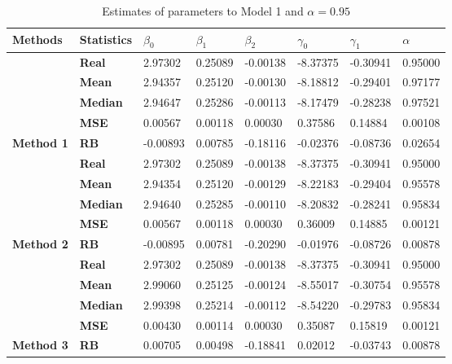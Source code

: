 \begin{table}[h]

\caption{\label{tab:Est_model_1_Alpha0.95}Estimates of parameters to Model 1 and $\alpha=0.95$}
\centering
\begin{tabular}[t]{>{}l>{}lllllll}
\toprule
Methods & Statistics & $\beta_0$ & $\beta_1$ & $\beta_2$ & $\gamma_0$ & $\gamma_1$ & $\alpha$\\
\midrule
 & \textbf{Real} & 2.97302 & 0.25089 & -0.00138 & -8.37375 & -0.30941 & 0.95000\\
\cmidrule{2-8}
 & \textbf{Mean} & 2.94357 & 0.25120 & -0.00130 & -8.18812 & -0.29401 & 0.97177\\
\cmidrule{2-8}
 & \textbf{Median} & 2.94647 & 0.25286 & -0.00113 & -8.17479 & -0.28238 & 0.97521\\
\cmidrule{2-8}
 & \textbf{MSE} & 0.00567 & 0.00118 & 0.00030 & 0.37586 & 0.14884 & 0.00108\\
\cmidrule{2-8}
\multirow{-5}{*}{\raggedright\arraybackslash \textbf{Method 1}} & \textbf{RB} & -0.00893 & 0.00785 & -0.18116 & -0.02376 & -0.08736 & 0.02654\\
\cmidrule{1-8}
 & \textbf{Real} & 2.97302 & 0.25089 & -0.00138 & -8.37375 & -0.30941 & 0.95000\\
\cmidrule{2-8}
 & \textbf{Mean} & 2.94354 & 0.25120 & -0.00129 & -8.22183 & -0.29404 & 0.95578\\
\cmidrule{2-8}
 & \textbf{Median} & 2.94640 & 0.25285 & -0.00110 & -8.20832 & -0.28241 & 0.95834\\
\cmidrule{2-8}
 & \textbf{MSE} & 0.00567 & 0.00118 & 0.00030 & 0.36009 & 0.14885 & 0.00121\\
\cmidrule{2-8}
\multirow{-5}{*}{\raggedright\arraybackslash \textbf{Method 2}} & \textbf{RB} & -0.00895 & 0.00781 & -0.20290 & -0.01976 & -0.08726 & 0.00878\\
\cmidrule{1-8}
 & \textbf{Real} & 2.97302 & 0.25089 & -0.00138 & -8.37375 & -0.30941 & 0.95000\\
\cmidrule{2-8}
 & \textbf{Mean} & 2.99060 & 0.25125 & -0.00124 & -8.55017 & -0.30754 & 0.95578\\
\cmidrule{2-8}
 & \textbf{Median} & 2.99398 & 0.25214 & -0.00112 & -8.54220 & -0.29783 & 0.95834\\
\cmidrule{2-8}
 & \textbf{MSE} & 0.00430 & 0.00114 & 0.00030 & 0.35087 & 0.15819 & 0.00121\\
\cmidrule{2-8}
\multirow{-5}{*}{\raggedright\arraybackslash \textbf{Method 3}} & \textbf{RB} & 0.00705 & 0.00498 & -0.18841 & 0.02012 & -0.03743 & 0.00878\\
\bottomrule
\end{tabular}
\end{table}
